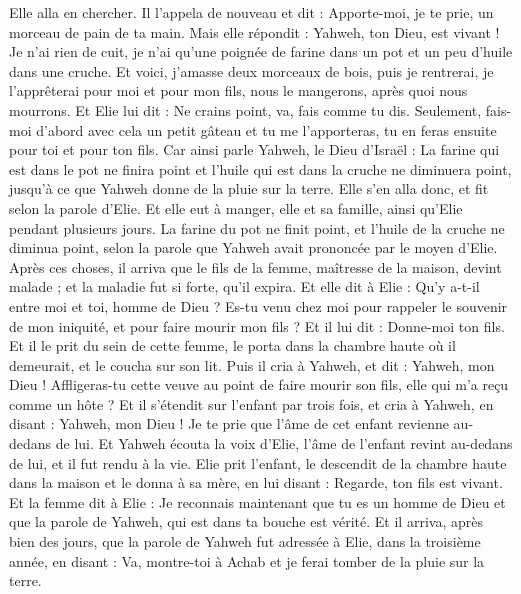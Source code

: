 \begin{multicols}{2}
Elle alla en chercher. Il l'appela de nouveau et dit : Apporte-moi, je te prie, un morceau de pain de ta main.
Mais elle répondit : Yahweh, ton Dieu, est vivant ! Je n'ai rien de cuit, je n'ai qu'une poignée de farine dans un pot et un peu d'huile dans une cruche. Et voici, j'amasse deux morceaux de bois, puis je rentrerai, je l'apprêterai pour moi et pour mon fils, nous le mangerons, après quoi nous mourrons.
Et Elie lui dit : Ne crains point, va, fais comme tu dis. Seulement, fais-moi d'abord avec cela un petit gâteau et tu me l'apporteras, tu en feras ensuite pour toi et pour ton fils.
Car ainsi parle Yahweh, le Dieu d'Israël : La farine qui est dans le pot ne finira point et l'huile qui est dans la cruche ne diminuera point, jusqu'à ce que Yahweh donne de la pluie sur la terre.
Elle s'en alla donc, et fit selon la parole d'Elie. Et elle eut à manger, elle et sa famille, ainsi qu'Elie pendant plusieurs jours.
La farine du pot ne finit point, et l'huile de la cruche ne diminua point, selon la parole que Yahweh avait prononcée par le moyen d'Elie.
Après ces choses, il arriva que le fils de la femme, maîtresse de la maison, devint malade ; et la maladie fut si forte, qu'il expira.
Et elle dit à Elie : Qu'y a-t-il entre moi et toi, homme de Dieu ? Es-tu venu chez moi pour rappeler le souvenir de mon iniquité, et pour faire mourir mon fils ?
Et il lui dit : Donne-moi ton fils. Et il le prit du sein de cette femme, le porta dans la chambre haute où il demeurait, et le coucha sur son lit.
Puis il cria à Yahweh, et dit : Yahweh, mon Dieu ! Affligeras-tu cette veuve au point de faire mourir son fils, elle qui m'a reçu comme un hôte ?
Et il s'étendit sur l'enfant par trois fois, et cria à Yahweh, en disant : Yahweh, mon Dieu ! Je te prie que l'âme de cet enfant revienne au-dedans de lui.
Et Yahweh écouta la voix d'Elie, l'âme de l'enfant revint au-dedans de lui, et il fut rendu à la vie.
Elie prit l'enfant, le descendit de la chambre haute dans la maison et le donna à sa mère, en lui disant : Regarde, ton fils est vivant.
Et la femme dit à Elie : Je reconnais maintenant que tu es un homme de Dieu et que la parole de Yahweh, qui est dans ta bouche est vérité.
\VerseOne{}Et il arriva, après bien des jours, que la parole de Yahweh fut adressée à Elie, dans la troisième année, en disant : Va, montre-toi à Achab et je ferai tomber de la pluie sur la terre.

\end{multicols}
